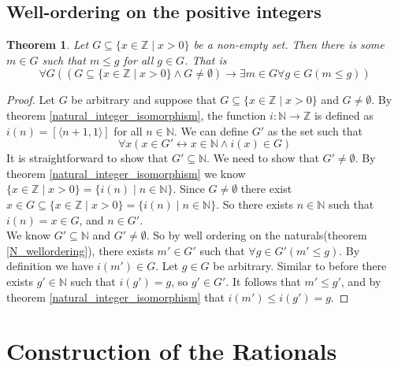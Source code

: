 \documentclass{report}
\newtheorem{theorem}[theo]{Theorem}
\begin{document}
\subsection{Well-ordering on the positive integers}
\begin{theorem}
Let $G\subseteq\{x\in\mathbb Z\mid x>0\}$ be a non-empty set. Then there is some $m\in G$ such that $m\leq g$ for all $g\in G$. That is
\begin{equation*}
\forall G((G\subseteq\{x\in\mathbb Z\mid x>0\}\land G\neq\emptyset)\to\exists m\in G\forall g\in G(m\leq g))
\end{equation*}
\end{theorem}
\begin{proof}
Let $G$ be arbitrary and suppose that $G\subseteq\{x\in\mathbb Z\mid x>0\}$ and $G\neq\emptyset$.
By theorem \ref{natural_integer_isomorphism}, the function $i:\mathbb N\to\mathbb Z$ is defined as $i(n)=[\langle n+1,1\rangle]$ for all $n\in\mathbb N$. We can define $G'$ as the set such that
\begin{equation*}
\forall x(x\in G'\leftrightarrow x\in\mathbb N\land i(x)\in G)
\end{equation*}
It is straightforward to show that $G'\subseteq\mathbb N$. We need to show that $G'\neq\emptyset$.
By theorem \ref{natural_integer_isomorphism} we know $\{x\in\mathbb Z\mid x>0\}=\{i(n)\mid n\in\mathbb N\}$.
Since $G\neq\emptyset$ there exist $x\in G\subseteq\{x\in\mathbb Z\mid x>0\}=\{i(n)\mid n\in\mathbb N\}$. So there exists $n\in\mathbb N$ such that $i(n)=x\in G$, and $n\in G'$.\\
\indent We know $G'\subseteq\mathbb N$ and $G'\neq\emptyset$. So by well ordering on the naturals(theorem \ref{N_wellordering}), there exists $m'\in G'$ such that $\forall g\in G'(m'\leq g)$.
By definition we have $i(m')\in G$. Let $g\in G$ be arbitrary. Similar to before there exists
$g'\in\mathbb N$ such that $i(g')=g$, so $g'\in G'$. It follows that
$m'\leq g'$, and by theorem \ref{natural_integer_isomorphism} that $i(m')\leq i(g')=g$.
\end{proof}
\newpage

\section{Construction of the Rationals}
\end{document}
